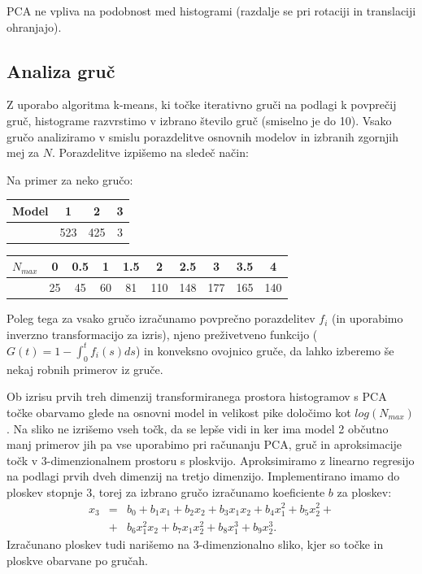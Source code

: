 \documentclass[a4paper]{IEEEtran}
\begin{document}
PCA ne vpliva na podobnost med histogrami (razdalje se pri rotaciji in translaciji ohranjajo).

\subsection{Analiza gruč}

Z uporabo algoritma k-means, ki točke iterativno gruči na podlagi k povprečij gruč, histograme razvrstimo v izbrano število gruč (smiselno je do 10). Vsako gručo analiziramo v smislu porazdelitve osnovnih modelov in izbranih zgornjih mej za $N$. Porazdelitve izpišemo na sledeč način:

Na primer za neko gručo:
\begin{center}
	\begin{tabular}{ l|ccc } 
	Model & 1 & 2 & 3 \\ \hline
	 & 523 & 425 & 3
	\end{tabular}
\begin{tabular}{ l|ccccccccc } 
	$N_{max}$ & 0 &	0.5&1 &1.5 &2 &2.5 &3 &	3.5&4 \\ \hline
	&25 &45 &60 &81&110 &148 &177 &165 &140
\end{tabular}
\end{center}

Poleg tega za vsako gručo izračunamo povprečno porazdelitev $f_i$ (in uporabimo inverzno transformacijo za izris), njeno preživetveno funkcijo ($G(t) = 1 - \int_0^t f_i(s) ds$) in konveksno ovojnico gruče, da lahko izberemo še nekaj robnih primerov iz gruče.

Ob izrisu prvih treh dimenzij transformiranega prostora histogramov s PCA točke obarvamo glede na osnovni model in velikost pike določimo kot $log(N_{max})$. Na sliko ne izrišemo vseh točk, da se lepše vidi in ker ima model 2 občutno manj primerov jih pa vse uporabimo pri računanju PCA, gruč in aproksimacije točk v 3-dimenzionalnem prostoru s ploskvijo. Aproksimiramo z linearno regresijo na podlagi prvih dveh dimenzij na tretjo dimenzijo. Implementirano imamo do ploskev stopnje 3, torej za izbrano gručo izračunamo koeficiente $b$ za ploskev: \begin{eqnarray}
x_3 &=& b_0 + b_1 x_1 + b_2 x_2 + b_3 x_1 x_2 + b_4 x_1^2 + b_5 x_2^2 + \nonumber \\
&+& b_6 x_1^2 x_2 + b_7 x_1 x_2^2 + b_8 x_1^3 + b_9 x_2^3. \nonumber
\end{eqnarray}
Izračunano ploskev tudi narišemo na 3-dimenzionalno sliko, kjer so točke in ploskve obarvane po gručah.
\end{document}
